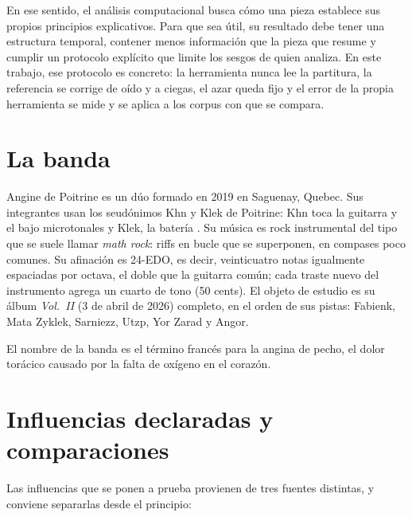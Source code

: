 En ese sentido, el análisis computacional busca cómo una pieza establece sus propios principios explicativos. Para que sea
útil, su resultado debe tener una estructura temporal, contener menos información que la pieza que resume y cumplir un
protocolo explícito que limite los sesgos de quien analiza. En este trabajo, ese protocolo es concreto: la herramienta
nunca lee la partitura, la referencia se corrige de oído y a ciegas, el azar queda fijo y el error de la propia
herramienta se mide y se aplica a los corpus con que se compara.

\section{La banda}

Angine de Poitrine es un dúo formado en 2019 en Saguenay, Quebec. Sus integrantes usan los seudónimos Khn y Klek de
Poitrine: Khn toca la guitarra y el bajo microtonales y Klek, la batería \citep{weller2026,dunlevie2026}. Su música es rock instrumental del tipo que se
suele llamar \emph{math rock}: riffs en bucle que se superponen, en compases poco comunes. Su afinación es 24-EDO, es
decir, veinticuatro notas igualmente espaciadas por octava, el doble que la guitarra común; cada traste nuevo del
instrumento agrega un cuarto de tono (50 cents). El objeto de estudio es su álbum \emph{Vol.~II} (3 de abril de 2026)
completo, en el orden de sus pistas: Fabienk, Mata Zyklek, Sarniezz, Utzp, Yor Zarad y Angor.

El nombre de la banda es el término francés para la angina de pecho, el dolor torácico causado por la falta de
oxígeno en el corazón.

\section{Influencias declaradas y comparaciones}\label{sec:influencias}

Las influencias que se ponen a prueba provienen de tres fuentes distintas, y conviene separarlas desde el principio:

